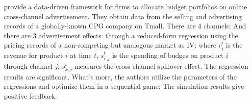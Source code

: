 \documentclass[10pt]{report}
\begin{document}
\cite{Deng2023} provide a data-driven framework for firms to allocate budget portfolios on online cross-channel advertisement.
They obtain data from the selling and advertising records of a globally-known CPG company on Tmall. There are 4 channels:
And there are 3 advertisement effects:
through a reduced-form regression using the pricing records of a non-competing but analogous market as IV:
where $r_i^t$ is the revenue for product $i$ at time $t$, $s_{i,j}^t$ is the spending of budges on product $i$ through channel $j$, $s_{k,j}^t$ measures the cross-channel spillover effect. The regression
results are significant. What's more, the authors utilize the parameters of the regressions and optimize them in a sequential game:
The simulation results give positive feedback.

\clearpage
\end{document}
